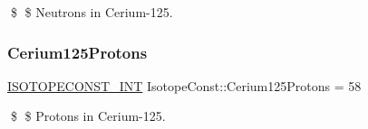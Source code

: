 \$ \$ Neutrons in Cerium-\/125. \mbox{\label{group___isotope_const-_cerium-_ce125_gab45f4f811029b6bf47206f36e5932c33}} 
\subsubsection{\texorpdfstring{Cerium125\+Protons}{Cerium125Protons}}
{\footnotesize\ttfamily \mbox{\hyperlink{group___isotope_const-_macros_ga5f18360b3e99483a35c32d789e62621c}{I\+S\+O\+T\+O\+P\+E\+C\+O\+N\+S\+T\+\_\+\+I\+NT}} Isotope\+Const\+::\+Cerium125\+Protons = 58}

\$ \$ Protons in Cerium-\/125. 